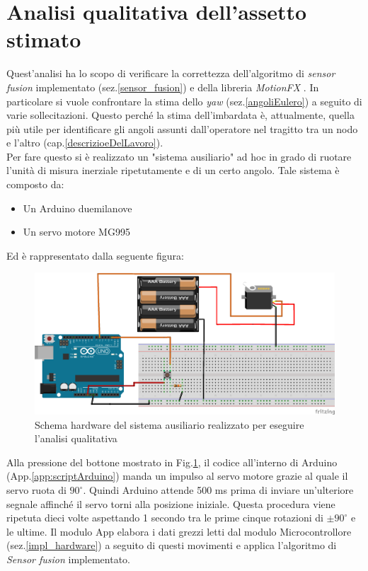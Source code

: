 \section{Analisi qualitativa dell'assetto stimato}
\label{analisiQualitativa}
Quest'analisi ha lo scopo di verificare la correttezza dell'algoritmo di \textit{sensor fusion} implementato (sez.\ref{sensor_fusion}) e della libreria \textit{MotionFX} \cite{motion}. In particolare si vuole confrontare la stima dello \textit{yaw} (sez.\ref{angoliEulero}) a seguito di varie sollecitazioni. Questo perché la stima dell'imbardata è, attualmente, quella più utile per  identificare gli angoli assunti dall'operatore nel tragitto tra un nodo e l'altro (cap.\ref{descrizioeDelLavoro}).\\
Per fare questo si è realizzato un "sistema ausiliario" ad hoc in grado di ruotare l'unità di misura inerziale ripetutamente e di un certo angolo. Tale sistema è composto da:
\begin{itemize}
	\item Un Arduino duemilanove
	\item Un servo motore MG995
\end{itemize}
Ed è rappresentato dalla seguente figura:
\begin{figure}[H]  
	\centering 
	\includegraphics[scale=0.5]{analisi/servo.png}
	\caption{Schema hardware del sistema ausiliario realizzato per eseguire l'analisi qualitativa}
	\label{fig:arduino}
\end{figure}
Alla pressione del bottone mostrato in Fig.\ref{fig:arduino}, il codice all'interno di Arduino (App.\ref{app:scriptArduino}) manda un impulso al servo motore grazie al quale il servo ruota di $90^{\circ}$. Quindi Arduino attende 500 ms prima di inviare un'ulteriore segnale affinché il servo torni alla posizione iniziale. Questa procedura viene ripetuta dieci volte aspettando 1 secondo tra le prime cinque rotazioni di $\pm 90^{\circ}$ e le ultime. Il modulo App elabora i dati grezzi letti dal modulo Microcontrollore (sez.\ref{impl_hardware}) a seguito di questi movimenti e applica l'algoritmo di \textit{Sensor fusion} implementato. \\
